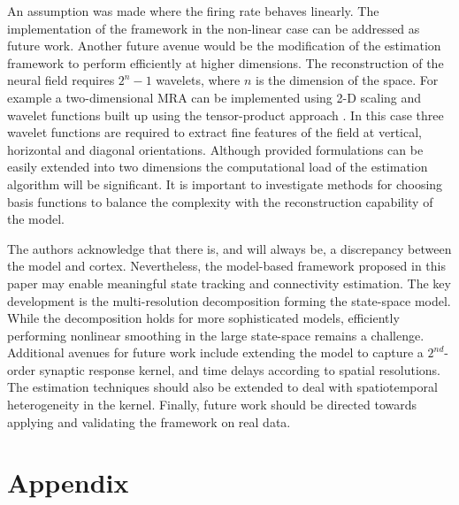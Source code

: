 \documentclass[11pt,draftcls,onecolumn,peerreview]{IEEEtran}
\begin{document}
An assumption was made where the firing rate behaves linearly. The implementation of the framework in the non-linear case can be addressed as future work. Another future avenue would be the modification of the estimation framework to perform efficiently at higher dimensions. The reconstruction of the neural field requires $2^n-1$ wavelets, where $n$ is the dimension of the space. For example a two-dimensional MRA can be implemented using 2-D scaling and wavelet functions built up using the tensor-product approach \cite{Meyer1992}. In this case three wavelet functions are required to  extract fine features of the field at vertical, horizontal and diagonal orientations. Although provided formulations can be easily extended into two dimensions the  computational load of the estimation algorithm will be significant. It is important to investigate methods for choosing basis functions to balance the complexity with the reconstruction capability of the model.
 
The authors acknowledge that there is, and will always be, a discrepancy between the model and cortex. Nevertheless, the model-based framework proposed in this paper may enable meaningful state tracking and connectivity estimation. The key development is the multi-resolution decomposition forming the state-space model. While the decomposition holds for more sophisticated models, efficiently performing nonlinear smoothing in the large state-space remains a challenge. Additional avenues for future work include extending the model to capture a $2^{nd}$-order synaptic response kernel, and time delays according to spatial resolutions. The estimation techniques should also be extended to deal with spatiotemporal heterogeneity in the kernel. Finally, future work should be directed towards applying and validating the framework on real data.
\section{Appendix}
\end{document}
